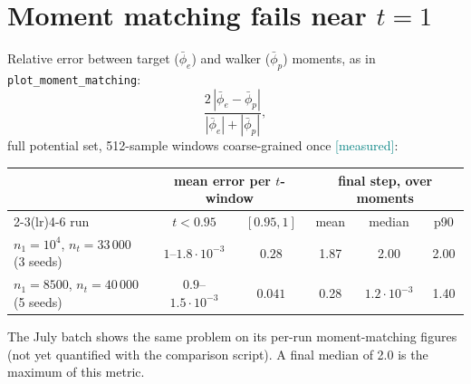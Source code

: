 \documentclass[11pt,a4paper]{article}
\newcommand{\code}[1]{\texttt{#1}}
\newcommand{\meas}{\textcolor{teal}{\textsf{[measured]}}}
\begin{document}
\section{Moment matching fails near $t=1$}
Relative error between target ($\bar\phi_e$) and walker ($\bar\phi_p$) moments, as in
\code{plot\_moment\_matching}:
\[ \frac{2\,|\bar\phi_e-\bar\phi_p|}{|\bar\phi_e|+|\bar\phi_p|}, \]
full potential set, 512-sample windows coarse-grained once \meas:

\begin{center}
\begin{tabular}{lccccc}
\toprule
 & \multicolumn{2}{c}{mean error per $t$-window} & \multicolumn{3}{c}{final step, over moments}\\
\cmidrule(lr){2-3}\cmidrule(lr){4-6}
run & $t<0.95$ & $[0.95,1]$ & mean & median & p90\\
\midrule
$n_1=10^4$, $n_t=33\,000$ (3 seeds) & $1$--$1.8\cdot10^{-3}$ & $0.28$ & 1.87 & 2.00 & 2.00\\
$n_1=8500$, $n_t=40\,000$ (5 seeds) & $0.9$--$1.5\cdot10^{-3}$ & $0.041$ & 0.28 & $1.2\cdot10^{-3}$ & 1.40\\
\bottomrule
\end{tabular}
\end{center}
The July batch shows the same problem on its per-run moment-matching figures (not yet
quantified with the comparison script). A final median of 2.0 is the maximum of this metric.
\end{document}
